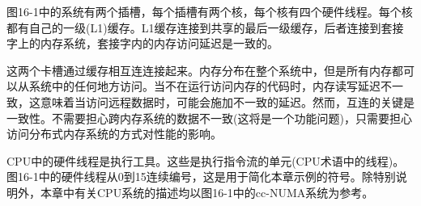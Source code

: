图16-1中的系统有两个插槽，每个插槽有两个核，每个核有四个硬件线程。每个核都有自己的一级(L1)缓存。L1缓存连接到共享的最后一级缓存，后者连接到套接字上的内存系统，套接字内的内存访问延迟是一致的。\par

这两个卡槽通过缓存相互连连接起来。内存分布在整个系统中，但是所有内存都可以从系统中的任何地方访问。当不在运行访问内存的代码时，内存读写延迟不一致，这意味着当访问远程数据时，可能会施加不一致的延迟。然而，互连的关键是一致性。不需要担心跨内存系统的数据不一致(这将是一个功能问题)，只需要担心访问分布式内存系统的方式对性能的影响。\par

CPU中的硬件线程是执行工具。这些是执行指令流的单元(CPU术语中的线程)。图16-1中的硬件线程从0到15连续编号，这是用于简化本章示例的符号。除特别说明外，本章中有关CPU系统的描述均以图16-1中的cc-NUMA系统为参考。\par




























































